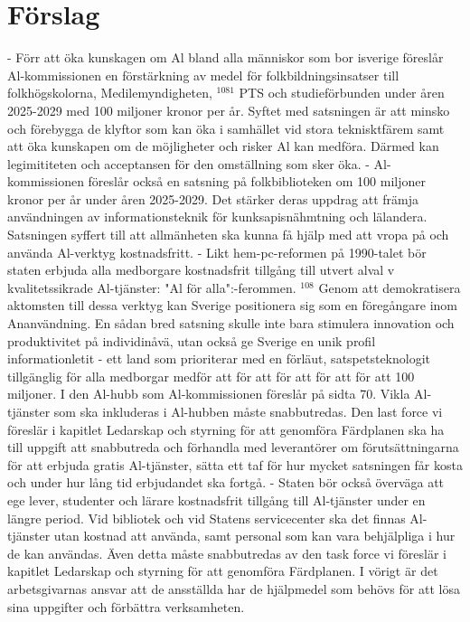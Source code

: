 {{{{{{{{\section*{Förslag}
- Förr att öka kunskagen om Al bland alla människor som bor isverige föreslår Al-kommissionen en förstärkning av medel för folkbildningsinsatser till folkhögskolorna, Medilemyndigheten, \({ }^{1081}\) PTS och studieförbunden under åren 2025-2029 med 100 miljoner kronor per år. Syftet med satsningen är att minsko och förebygga de klyftor som kan öka i samhället vid stora teknisktfärem samt att öka kunskapen om de möjligheter och risker Al kan medföra. Därmed kan legimititeten och acceptansen för den omställning som sker öka.
- Al-kommissionen föreslår också en satsning på folkbiblioteken om 100 miljoner kronor per år under åren 2025-2029. Det stärker deras uppdrag att främja användningen av informationsteknik för kunksapisnähmtning och lälandera. Satsningen syffert till att allmänheten ska kunna få hjälp med att vropa på och använda Al-verktyg kostnadsfritt.
- Likt hem-pc-reformen på 1990-talet bör staten erbjuda alla medborgare kostnadsfrit tillgång till utvert alval v kvalitetssikrade Al-tjänster: "Al för alla":-ferommen. \({ }^{108}\) Genom att demokratisera aktomsten till dessa verktyg kan Sverige positionera sig som en föregångare inom Ananvändning. En sådan bred satsning skulle inte bara stimulera innovation och produktivitet på individinåvä, utan också ge Sverige en unik profil informationletit - ett land som prioriterar med en förläut, satspetsteknologit tillgänglig för alla medborgar medför att för att för att för att för att 100 miljoner. I den Al-hubb som Al-kommissionen föreslår på sidta 70. Vikla Al-tjänster som ska inkluderas i Al-hubben måste snabbutredas. Den last force vi föreslär i kapitlet Ledarskap och styrning för att genomföra Färdplanen ska ha till uppgift att snabbutreda och förhandla med leverantörer om förutsättningarna för att erbjuda gratis Al-tjänster, sätta ett taf för hur mycket satsningen får kosta och under hur lång tid erbjudandet ska fortgå.
- Staten bör också överväga att ege lever, studenter och lärare kostnadsfrit tillgång till Al-tjänster under en längre period. Vid bibliotek och vid Statens servicecenter ska det finnas Al-tjänster utan kostnad att använda, samt personal som kan vara behjälpliga i hur de kan användas. Även detta måste snabbutredas av den task force vi föreslär i kapitlet Ledarskap och styrning för att genomföra Färdplanen. I vörigt är det arbetsgivarnas ansvar att de ansställda har de hjälpmedel som behövs för att lösa sina uppgifter och förbättra verksamheten.
}}}}}}}}
